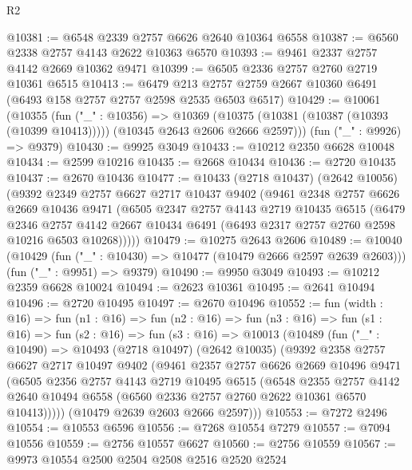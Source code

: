 \begin{lexlean}{R2}
\begin{coremodule}
@10381 := @6548 @2339 @2757 @6626 @2640 @10364 @6558
@10387 := @6560 @2338 @2757 @4143 @2622 @10363 @6570
@10393 := @9461 @2337 @2757 @4142 @2669 @10362 @9471
@10399 := @6505 @2336 @2757 @2760 @2719 @10361 @6515
@10413 := @6479 @213 @2757 @2759 @2667 @10360 @6491 (@6493 @158 @2757 @2757 @2598 @2535 @6503 @6517)
@10429 := @10061
    (@10355
      (fun ("_" : @10356) =>
      @10369 (@10375 (@10381 (@10387 (@10393 (@10399 @10413))))) (@10345 @2643 @2606 @2666 @2597)))
    (fun ("_" : @9926) => @9379)
@10430 := @9925 @3049
@10433 := @10212 @2350 @6628 @10048
@10434 := @2599 @10216
@10435 := @2668 @10434
@10436 := @2720 @10435
@10437 := @2670 @10436
@10477 := @10433
    (@2718 @10437)
    (@2642 @10056)
    (@9392
      @2349
      @2757
      @6627
      @2717
      @10437
      @9402
      (@9461
        @2348
        @2757
        @6626
        @2669
        @10436
        @9471
        (@6505
          @2347
          @2757
          @4143
          @2719
          @10435
          @6515
          (@6479
            @2346
            @2757
            @4142
            @2667
            @10434
            @6491
            (@6493 @2317 @2757 @2760 @2598 @10216 @6503 @10268)))))
@10479 := @10275 @2643 @2606
@10489 := @10040
    (@10429 (fun ("_" : @10430) => @10477 (@10479 @2666 @2597 @2639 @2603)))
    (fun ("_" : @9951) => @9379)
@10490 := @9950 @3049
@10493 := @10212 @2359 @6628 @10024
@10494 := @2623 @10361
@10495 := @2641 @10494
@10496 := @2720 @10495
@10497 := @2670 @10496
@10552 := fun (width : @16) =>
  fun (n1 : @16) =>
  fun (n2 : @16) =>
  fun (n3 : @16) =>
  fun (s1 : @16) =>
  fun (s2 : @16) =>
  fun (s3 : @16) =>
  @10013
    (@10489
      (fun ("_" : @10490) =>
      @10493
        (@2718 @10497)
        (@2642 @10035)
        (@9392
          @2358
          @2757
          @6627
          @2717
          @10497
          @9402
          (@9461
            @2357
            @2757
            @6626
            @2669
            @10496
            @9471
            (@6505
              @2356
              @2757
              @4143
              @2719
              @10495
              @6515
              (@6548
                @2355
                @2757
                @4142
                @2640
                @10494
                @6558
                (@6560 @2336 @2757 @2760 @2622 @10361 @6570 @10413)))))
        (@10479 @2639 @2603 @2666 @2597)))
@10553 := @7272 @2496
@10554 := @10553 @6596
@10556 := @7268 @10554 @7279
@10557 := @7094 @10556
@10559 := @2756 @10557 @6627
@10560 := @2756 @10559
@10567 := @9973 @10554 @2500 @2504 @2508 @2516 @2520 @2524

\end{coremodule}
\end{lexlean}
